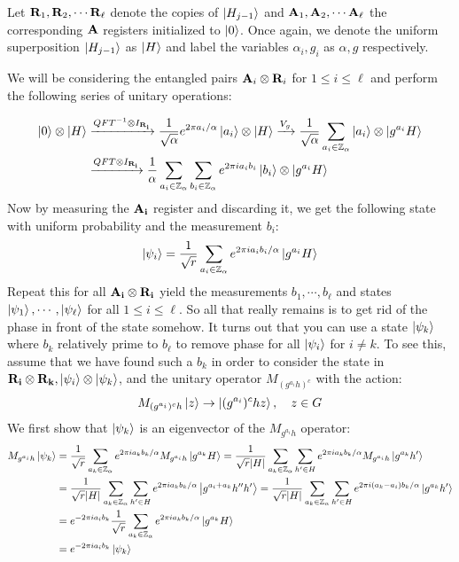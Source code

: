 Let ${\bf R}_1, {\bf R}_2, \cdots {\bf R}_\ell$ denote the copies of $\ket{H_{j-1}}$ and ${\bf A}_1, {\bf A}_2, \cdots {\bf A}_\ell$ the corresponding ${\bf A}$ registers initialized to $\ket{0}$. Once again, we denote the uniform superposition $\ket{H_{j-1}}$ as $\ket{H}$ and label the variables $\alpha_i, g_i$ as $\alpha, g$ respectively.

We will be considering the entangled pairs ${\bf A}_i \otimes {\bf R}_i$ for $1 \leq i \leq \ell$ and perform the following series of unitary operations:

\begin{align*}
  \ket{0} \otimes \ket{H}
  & \xrightarrow{QFT^{-1} \otimes I_{\bf R_i}} \frac{1}{\sqrt{\alpha}} e^{2\pi a_i/\alpha} \ket{a_i} \otimes \ket{H} \xrightarrow{V_g} \frac{1}{\sqrt{\alpha}}\sum_{a_i \in \mathbb{Z_\alpha}} \ket{a_i} \otimes \ket{g^{a_i}H} \\
  & \xrightarrow{QFT \otimes I_{\bf R_i}} \frac{1}{\alpha}\sum_{a_i \in \mathbb{Z}_\alpha}\sum_{b_i \in \mathbb{Z}_\alpha} e^{2\pi i a_ib_i } \ket{b_i} \otimes \ket{g^{a_i}H}
\end{align*}
%
Now by measuring the ${\bf A_i}$ register and discarding it, we get the following state with uniform probability and the measurement $b_i$:
%
\[\ket{\psi_i} = \frac{1}{\sqrt{r}} \sum_{a_i \in \mathbb{Z}_\alpha} e^{2\pi i a_i b_i / \alpha} \ket{g^{a_i}H} \]
%
Repeat this for all ${\bf A_i} \otimes {\bf R_i}$ yield the measurements $b_1, \cdots, b_\ell$ and states $\ket{\psi_1}, \cdots, \ket{\psi_\ell}$ for all $1 \leq i \leq \ell$.
%
So all that really remains is to get rid of the phase in front of the state somehow. It turns out that you can use a state $\ket{\psi_k}$ where $b_k$ relatively prime to $b_\ell$ to remove phase for all $\ket{\psi_i}$ for $i \neq k$. To see this, assume that we have found such a $b_k$ in order to consider the state in ${\bf R_i} \otimes {\bf R_k}, \ket{\psi_i} \otimes \ket{\psi_k}$, and the unitary operator $M_{(g^{a_i}h)^c}$ with the action:
%
\[ M_{(g^{a_i})^ch} \ket{z} \rightarrow  \ket{(g^{a_i})^chz}, \quad z \in G\]
%
We first show that $\ket{\psi_k}$ is an eigenvector of the $M_{g^{a_i}h}$ operator:
\begin{align*}
M_{g^{a_i}h} \ket{\psi_k}
& = \frac{1}{\sqrt{r}} \sum_{a_k \in \mathbb{Z}_\alpha} e^{2\pi i a_kb_k / \alpha} M_{g^{a_i}h} \ket{g^{a_k}H} =  \frac{1}{\sqrt{r}|H|} \sum_{a_k \in \mathbb{Z}_\alpha} \sum_{h' \in H} e^{2\pi i a_kb_k / \alpha} M_{g^{a_i}h} \ket{g^{a_k}h'} \\
& = \frac{1}{\sqrt{r}|H|} \sum_{a_k \in \mathbb{Z}_\alpha} \sum_{h' \in H} e^{2\pi i a_kb_k / \alpha} \ket{g^{a_i+a_k}h''h'} = \frac{1}{\sqrt{r}|H|} \sum_{a_k \in \mathbb{Z}_\alpha} \sum_{h' \in H} e^{2\pi i (a_k-a_i)b_k / \alpha} \ket{g^{a_k}h'} \\
& =  e^{-2\pi i a_ib_k}  \frac{1}{\sqrt{r}} \sum_{a_k \in \mathbb{Z}_\alpha} e^{2\pi i a_kb_k / \alpha} \ket{g^{a_k}H} \\
& = e^{-2\pi i a_ib_k} \ket{\psi_k}
\end{align*}
